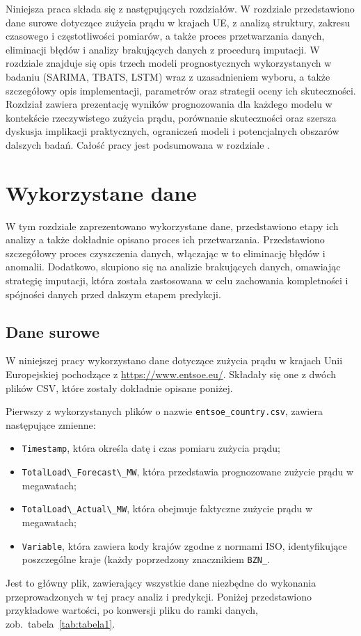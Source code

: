 \documentclass[polish, twoside, 12pt, a4paper]{article}
\theoremstyle{definition}
\theoremstyle{plain}
\theoremstyle{remark}
\newcommand{\code}[1]{\lstinline{#1}}
\begin{document}
Niniejsza praca składa się z następujących rozdziałów. W rozdziale \textit{} przedstawiono dane surowe dotyczące zużycia prądu w krajach UE, z analizą struktury, zakresu czasowego i częstotliwości pomiarów, a także proces przetwarzania danych, eliminacji błędów i analizy brakujących danych z procedurą imputacji. W rozdziale \textit{} znajduje się opis trzech modeli prognostycznych wykorzystanych w badaniu (SARIMA, TBATS, LSTM) wraz z uzasadnieniem wyboru, a także szczegółowy opis implementacji, parametrów oraz strategii oceny ich skuteczności. Rozdział \textit{} zawiera prezentację wyników prognozowania dla każdego modelu w kontekście rzeczywistego zużycia prądu, porównanie skuteczności oraz szersza dyskusja implikacji praktycznych, ograniczeń modeli i potencjalnych obszarów dalszych badań. Całość pracy jest podsumowana w rozdziale \textit{}.


\clearpage
\section{Wykorzystane dane}\label{sec:dane}

W tym rozdziale zaprezentowano wykorzystane dane, przedstawiono etapy ich analizy a także dokładnie opisano proces ich przetwarzania. Przedstawiono szczegółowy proces czyszczenia danych, włączając w to eliminację błędów i anomalii. Dodatkowo, skupiono się na analizie brakujących danych, omawiając strategię imputacji, która została zastosowana w celu zachowania kompletności i spójności danych przed dalszym etapem predykcji.

\subsection{Dane surowe}

W niniejszej pracy wykorzystano dane dotyczące zużycia prądu w krajach Unii Europejskiej pochodzące z \url{https://www.entsoe.eu/}. Składały się one z dwóch plików CSV, które zostały dokładnie opisane poniżej. 

Pierwszy z wykorzystanych plików o nazwie \code{entsoe_country.csv}, zawiera następujące zmienne:
\begin{itemize}[noitemsep]
    \item \code{Timestamp}, która określa datę i czas pomiaru zużycia prądu;
    \item \code{TotalLoad\_Forecast\_MW}, która przedstawia prognozowane zużycie prądu w megawatach;
    \item \code{TotalLoad\_Actual\_MW}, która obejmuje faktyczne zużycie prądu w megawatach;
    \item \code{Variable}, która zawiera kody krajów zgodne z normami ISO, identyfikujące poszczególne kraje (każdy poprzedzony znacznikiem \code{BZN_}.
\end{itemize}
Jest to główny plik, zawierający wszystkie dane niezbędne do wykonania przeprowadzonych w tej pracy analiz i predykcji. Poniżej przedstawiono przykładowe wartości, po konwersji pliku do ramki danych, zob.~tabela~\ref{tab:tabela1}. 
\end{document}
